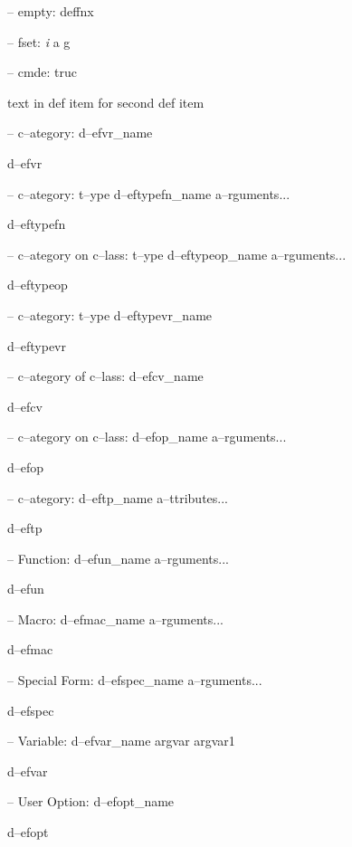 \documentclass{book}
\begin{document}
\hbox{}-- empty: deffnx




\hbox{}-- fset: \emph{i} a g


\hbox{}-- cmde: truc 


text in def item for second def item




\hbox{}-- c--ategory: d--efvr\_name


d--efvr




\hbox{}-- c--ategory: t--ype d--eftypefn\_name a--rguments...


d--eftypefn




\hbox{}-- c--ategory on c--lass: t--ype d--eftypeop\_name a--rguments...


d--eftypeop




\hbox{}-- c--ategory: t--ype d--eftypevr\_name


d--eftypevr




\hbox{}-- c--ategory of c--lass: d--efcv\_name


d--efcv




\hbox{}-- c--ategory on c--lass: d--efop\_name a--rguments...


d--efop




\hbox{}-- c--ategory: d--eftp\_name a--ttributes...


d--eftp




\hbox{}-- Function: d--efun\_name a--rguments...


d--efun




\hbox{}-- Macro: d--efmac\_name a--rguments...


d--efmac




\hbox{}-- Special Form: d--efspec\_name a--rguments...


d--efspec




\hbox{}-- Variable: d--efvar\_name argvar argvar1


d--efvar




\hbox{}-- User Option: d--efopt\_name


d--efopt
\end{document}
